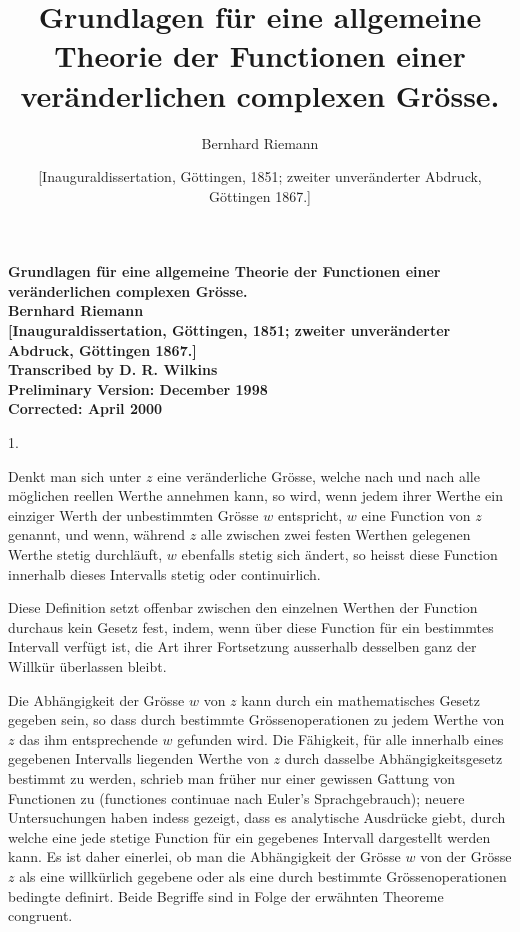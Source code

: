 \documentclass[a4paper,12pt]{article}
\begin{document}
\thispagestyle{empty}
\begin{center}
\Large\bfseries
Grundlagen f\"{u}r eine allgemeine Theorie der Functionen
einer ver\"{a}nderlichen complexen Gr\"{o}sse.\\[12 pt]
Bernhard Riemann\\[12 pt]
[Inauguraldissertation, G\"{o}ttingen, 1851; zweiter
unver\"{a}nderter Abdruck, G\"{o}ttingen 1867.]\\[24 pt]
\large\mdseries
Transcribed by D. R. Wilkins\\[12 pt]
Preliminary Version: December 1998\\
Corrected: April 2000
\end{center}

\newpage
\setcounter{page}{1}

\title{Grundlagen f\"{u}r eine allgemeine Theorie der Functionen
einer ver\"{a}nderlichen complexen Gr\"{o}sse.}
\author{Bernhard Riemann}
\date{[Inauguraldissertation, G\"{o}ttingen, 1851; zweiter
unver\"{a}nderter Abdruck, G\"{o}ttingen 1867.]}

\maketitle

\centerline{1.}

\nobreak\medskip

Denkt man sich unter $z$ eine ver\"{a}nderliche Gr\"{o}sse,
welche nach und nach alle m\"{o}glichen reellen Werthe annehmen
kann, so wird, wenn jedem ihrer Werthe ein einziger Werth der
unbestimmten Gr\"{o}sse $w$ entspricht, $w$ eine Function von $z$
genannt, und wenn, w\"{a}hrend $z$ alle zwischen zwei festen
Werthen gelegenen Werthe stetig durchl\"{a}uft, $w$ ebenfalls
stetig sich \"{a}ndert, so heisst diese Function innerhalb dieses
Intervalls stetig oder continuirlich.

Diese Definition setzt offenbar zwischen den einzelnen Werthen
der Function durchaus kein Gesetz fest, indem, wenn \"{u}ber
diese Function f\"{u}r ein bestimmtes Intervall verf\"{u}gt ist,
die Art ihrer Fortsetzung ausserhalb desselben ganz der
Willk\"{u}r \"{u}berlassen bleibt.

Die Abh\"{a}ngigkeit der Gr\"{o}sse $w$ von $z$ kann durch ein
mathematisches Gesetz gegeben sein, so dass durch bestimmte
Gr\"{o}ssenoperationen zu jedem Werthe von $z$ das ihm
entsprechende $w$ gefunden wird.  Die F\"{a}higkeit, f\"{u}r alle
innerhalb eines gegebenen Intervalls liegenden Werthe von $z$
durch dasselbe Abh\"{a}ngigkeitsgesetz bestimmt zu werden,
schrieb man fr\"{u}her nur einer gewissen Gattung von Functionen
zu (functiones continuae nach Euler's Sprachgebrauch); neuere
Untersuchungen haben indess gezeigt, dass es analytische
Ausdr\"{u}cke giebt, durch welche eine jede stetige Function
f\"{u}r ein gegebenes Intervall dargestellt werden kann.  Es ist
daher einerlei, ob man die Abh\"{a}ngigkeit der Gr\"{o}sse $w$
von der Gr\"{o}sse $z$ als eine willk\"{u}rlich gegebene oder als
eine durch bestimmte Gr\"{o}ssenoperationen bedingte definirt.
Beide Begriffe sind in Folge der erw\"{a}hnten Theoreme congruent.
\end{document}

